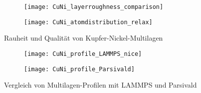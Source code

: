 \begin{figure}
  \captionsetup[subfigure]{singlelinecheck=false}
  \def\subfigwidth{7cm}
  \begin{subfigure}[t]{\subfigwidth}
    \texttt{[image: CuNi\_layerroughness\_comparison]}
    \label{fig:multilayerplots-a}
  \end{subfigure}
  \hfill
  \begin{subfigure}[t]{\subfigwidth}
    \texttt{[image: CuNi\_atomdistribution\_relax]}
    \label{fig:multilayerplots-b}
  \end{subfigure}
  \caption[Rauheit und Qualität von Kupfer-Nickel-Multilagen]{
    Rauheit und Qualität von Kupfer-Nickel-Multilagen
  }
  \label{fig:multilayerplots}
\end{figure}

\begin{figure}
  \captionsetup[subfigure]{singlelinecheck=false}
  \def\subfigwidth{7cm}
  \begin{subfigure}[t]{\subfigwidth}
    \texttt{[image: CuNi\_profile\_LAMMPS\_nice]}
  \end{subfigure}
  \hfill
  \begin{subfigure}[t]{\subfigwidth}
    \texttt{[image: CuNi\_profile\_Parsivald]}
  \end{subfigure}
  \caption{Vergleich von Multilagen-Profilen mit LAMMPS und Parsivald}
  \label{fig:multilayerresults}
\end{figure}

